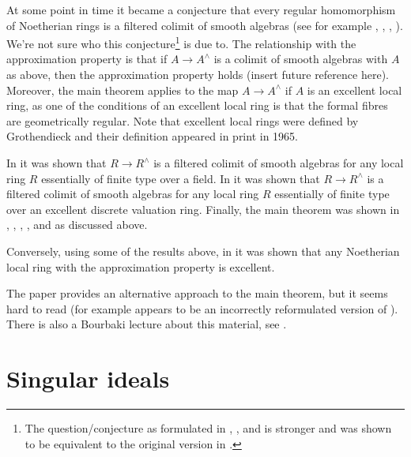 \medskip\noindent
At some point in time it became a conjecture
that every regular homomorphism of Noetherian rings is a
filtered colimit of smooth algebras (see for example
\cite{Raynaud-Rennes}, \cite{popescu-global}, \cite{Artin-power-series},
\cite{Artin-Denef}). We're not sure who this conjecture\footnote{The
question/conjecture as formulated in \cite{Artin-power-series},
\cite{Artin-Denef}, and \cite{popescu-global} is stronger and was shown
to be equivalent to the original version in \cite{Cipu}.}
is due to. The relationship with the approximation property is that if
$A \to A^\wedge$ is a colimit of smooth algebras with $A$ as above,
then the approximation
property holds (insert future reference here). Moreover, the main theorem
applies to the map $A \to A^\wedge$ if $A$ is an excellent local ring, as one
of the conditions of an excellent local ring is that the formal
fibres are geometrically regular. Note that excellent local rings
were defined by Grothendieck and their definition appeared in
print in 1965.

\medskip\noindent
In \cite{Artin-power-series} it was shown that
$R \to R^\wedge$ is a filtered colimit of smooth algebras for any
local ring $R$ essentially of finite type over a field.
In \cite{Rotthaus-Artin} it was shown that $R \to R^\wedge$
is a filtered colimit of smooth algebras for any local ring $R$
essentially of finite type over an excellent discrete valuation ring.
Finally, the main theorem was shown in
\cite{popescu-GND}, \cite{popescu-GNDA}, \cite{popescu-letter}, 
\cite{Ogoma}, and \cite{swan} as discussed above.

\medskip\noindent
Conversely, using some of the results above, in \cite{Rotthaus-excellent}
it was shown that any Noetherian local ring with the approximation property
is excellent.

\medskip\noindent
The paper \cite{Spivakovsky} provides an alternative approach to the
main theorem, but it seems hard to read (for example
\cite[Lemma 5.2]{Spivakovsky} appears to be an incorrectly reformulated
version of \cite[Lemma 3]{Elkik}). There is also a Bourbaki
lecture about this material, see \cite{Teissier}.












\section{Singular ideals}
\label{section-singular-ideal}

